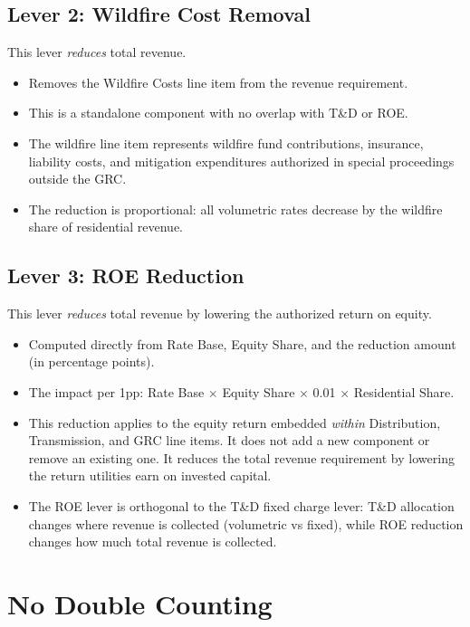 \documentclass[11pt]{article}
\begin{document}
\subsection{Lever 2: Wildfire Cost Removal}

This lever \textit{reduces} total revenue.

\begin{itemize}
    \item Removes the Wildfire Costs line item from the revenue requirement.
    \item This is a standalone component with no overlap with T\&D or ROE.
    \item The wildfire line item represents wildfire fund contributions, insurance, liability costs, and mitigation expenditures authorized in special proceedings outside the GRC.
    \item The reduction is proportional: all volumetric rates decrease by the wildfire share of residential revenue.
\end{itemize}

\subsection{Lever 3: ROE Reduction}

This lever \textit{reduces} total revenue by lowering the authorized return on equity.

\begin{itemize}
    \item Computed directly from Rate Base, Equity Share, and the reduction amount (in percentage points).
    \item The impact per 1pp: Rate Base $\times$ Equity Share $\times$ 0.01 $\times$ Residential Share.
    \item This reduction applies to the equity return embedded \textit{within} Distribution, Transmission, and GRC line items. It does not add a new component or remove an existing one. It reduces the total revenue requirement by lowering the return utilities earn on invested capital.
    \item The ROE lever is orthogonal to the T\&D fixed charge lever: T\&D allocation changes where revenue is collected (volumetric vs fixed), while ROE reduction changes how much total revenue is collected.
\end{itemize}

\section{No Double Counting}
\end{document}
